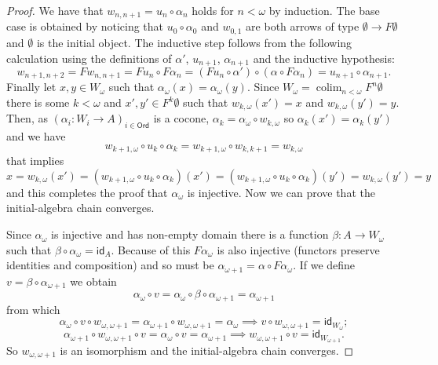 \documentclass[letterpaper, 11pt, oneside]{memoir}
\theoremstyle{myteo}
\numberwithin{equation}{section}
\DeclareMathOperator*\colim{colim}
\newcommand{\id}{\textsf{id}}
\newcommand{\Ord}{\textsf{Ord}}
\begin{document}
\begin{proof}
  We have that \(w_{n, n+1} = u_n \circ \alpha_n\) holds for \(n < \omega\) by induction.
  The base case is obtained by noticing that \(u_0 \circ \alpha_0\) and \(w_{0,1}\) are both arrows of type \(\emptyset \to F\emptyset\) and \(\emptyset\) is the initial object.
  The inductive step follows from the following calculation using the definitions of \(\alpha'\), \(u_{n+1}\), \(\alpha_{n+1}\) and the inductive hypothesis:
  \begin{equation*}
    w_{n+1, n+2} = Fw_{n, n+1} = Fu_n \circ F\alpha_n = (Fu_n \circ \alpha') \circ (\alpha \circ F\alpha_n) = u_{n+1} \circ \alpha_{n+1}.
  \end{equation*}
  Finally let \(x, y \in W_\omega\) such that \(\alpha_\omega(x) = \alpha_\omega(y)\).
  Since \(W_\omega = \colim_{n < \omega}F^n\emptyset\) there is some \(k < \omega\) and \(x', y' \in F^k\emptyset\) such that \(w_{k, \omega}(x') = x\) and \(w_{k, \omega}(y') = y\).
  Then, as \((\alpha_i: W_i \to A)_{i \in \Ord}\) is a cocone, \(\alpha_k = \alpha_\omega \circ w_{k, \omega}\) so \(\alpha_k(x') = \alpha_k(y')\) and we have
  \begin{equation*}
    w_{k+1, \omega} \circ u_k \circ \alpha_k = w_{k+1, \omega} \circ w_{k, k+1} = w_{k, \omega}
  \end{equation*}
  that implies
  \begin{equation*}
    x = w_{k, \omega}(x') = (w_{k+1, \omega} \circ u_k \circ \alpha_k)(x') = (w_{k+1, \omega} \circ u_k \circ \alpha_k)(y') = w_{k, \omega}(y') = y
  \end{equation*}
  and this completes the proof that \(\alpha_\omega\) is injective.
  Now we can prove that the initial-algebra chain converges.

  Since \(\alpha_\omega\) is injective and has non-empty domain there is a function  \(\beta : A \to W_\omega\) such that \(\beta \circ \alpha_\omega  = \id_A\).
  Because of this \(F\alpha_\omega\) is also injective (functors preserve identities and composition) and so must be \(\alpha_{\omega + 1} = \alpha \circ F\alpha_\omega\).
  If we define \(v = \beta \circ \alpha_{\omega + 1}\) we obtain
  \begin{equation*}
    \alpha_\omega \circ v = \alpha_\omega \circ \beta \circ \alpha_{\omega + 1} = \alpha_{\omega + 1}
  \end{equation*}
  from which
  \begin{equation*}
     \alpha_\omega \circ v \circ w_{\omega, \omega + 1} = \alpha_{\omega + 1} \circ w_{\omega, \omega + 1} = \alpha_\omega \implies v \circ w_{\omega, \omega + 1} = \id_{W_\omega};
  \end{equation*}
  \begin{equation*}
    \alpha_{\omega + 1} \circ w_{\omega, \omega + 1} \circ v = \alpha_{\omega} \circ v = \alpha_{\omega + 1} \implies  w_{\omega, \omega + 1} \circ v = \id_{W_{\omega + 1}}.
  \end{equation*}
  So \(w_{\omega, \omega + 1}\) is an isomorphism and the initial-algebra chain converges.
\end{proof}
\end{document}
